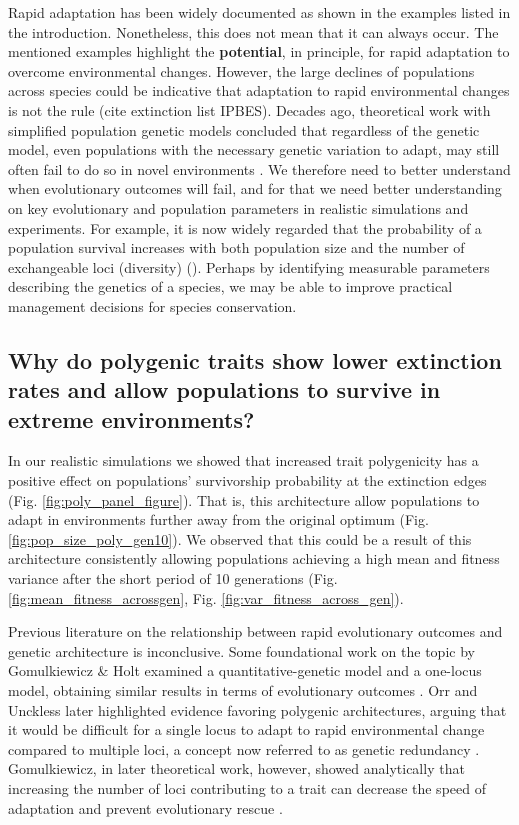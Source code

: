 \documentclass{article}
\begin{document}
Rapid adaptation has been widely documented as shown in the examples listed in the introduction. Nonetheless, this does not mean that it can always occur. The mentioned examples highlight the \textbf{potential}, in principle, for rapid adaptation to overcome environmental changes. However,  the large declines of populations across species could be indicative that adaptation to rapid environmental changes is not the rule (cite extinction list IPBES). Decades ago, theoretical work with simplified population genetic models concluded that regardless of the genetic model, even populations with the necessary genetic variation to adapt, may still often fail to do so in novel environments  \citep{Gomulkiewicz1995-sj}. We therefore need to better understand when evolutionary outcomes will fail, and for that we need better understanding on key evolutionary and population parameters in realistic simulations and experiments. For example, it is now widely regarded that the  probability  of  a population  survival  increases  with  both  population  size  and  the number of exchangeable loci (diversity) (\citep{Newman1997-tx, Markert2010-wc, Nabutanyi2022-jb}). Perhaps by identifying measurable parameters describing the genetics of a species, we may be able to improve practical management decisions for species conservation. 

\subsection{Why do polygenic traits show lower extinction rates and allow populations to survive in extreme environments?}

In our realistic simulations we showed that increased trait polygenicity has a positive effect on populations' survivorship probability at the extinction edges (Fig. \ref{fig:poly_panel_figure}). That is, this architecture allow populations to adapt in environments further away from the original optimum (Fig. \ref{fig:pop_size_poly_gen10}). We observed that this could be a result of this architecture consistently allowing populations achieving a high mean and fitness variance after the short period of 10 generations (Fig. \ref{fig:mean_fitness_acrossgen},  Fig. \ref{fig:var_fitness_across_gen}).

Previous literature on the relationship between rapid evolutionary outcomes and genetic architecture is inconclusive. Some foundational work on the topic by Gomulkiewicz \& Holt examined a quantitative-genetic model and a one-locus model, obtaining similar results in terms of evolutionary outcomes \citep{Gomulkiewicz1995-sj}. Orr and Unckless later highlighted evidence favoring polygenic architectures, arguing that it would be difficult for a single locus to adapt to rapid environmental change compared to multiple loci, a concept now referred to as genetic redundancy \citep{Laruson2020-kd}. Gomulkiewicz, in later theoretical work, however, showed analytically that increasing the number of loci contributing to a trait can decrease the speed of adaptation and prevent evolutionary rescue \citep{Gomulkiewicz2010-wr}.
\end{document}
